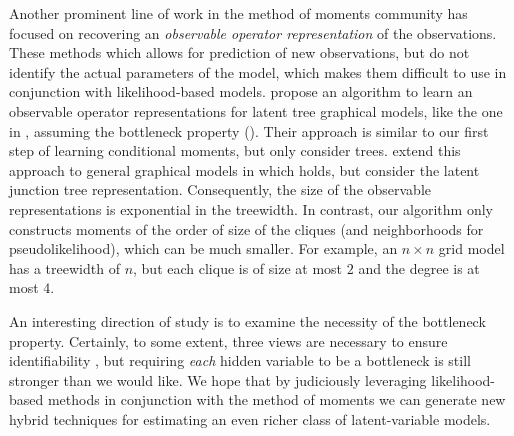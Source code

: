Another prominent line of work in the method of moments community has
  focused on recovering an {\em observable operator
  representation} of the observations.
  These methods which allows for prediction of new observations, but do not
  identify the actual parameters of the model, which makes them difficult to use
  in conjunction with likelihood-based models. %
\citet{song2011spectral} propose an algorithm to learn an observable
  operator representations for latent tree graphical models, like the
  one in , assuming the bottleneck property (). 
Their approach is similar to our first step of learning conditional moments,
  but only consider trees.
\citet{parikh12spectral} extend this approach to general graphical
  models in which  holds, but consider the latent
  junction tree representation. 
  Consequently, the size of the observable representations is exponential in
  the treewidth.
  In contrast, our algorithm only constructs moments of the order of size of the cliques
  (and neighborhoods for pseudolikelihood), which can be much smaller.
For example, an $n\times n$ grid model has a treewidth of $n$, but each
  clique is of size at most $2$ and the degree is at most $4$.

An interesting direction of study is to examine the necessity of the bottleneck
property.  Certainly, to some extent, three views are necessary to ensure
identifiability \cite{kruskal77three}, but requiring \emph{each} hidden variable to be
a bottleneck is still stronger than we would like.  We hope that by judiciously
leveraging likelihood-based methods in conjunction with the method of moments
we can generate new hybrid techniques for estimating
an even richer class of latent-variable models.
